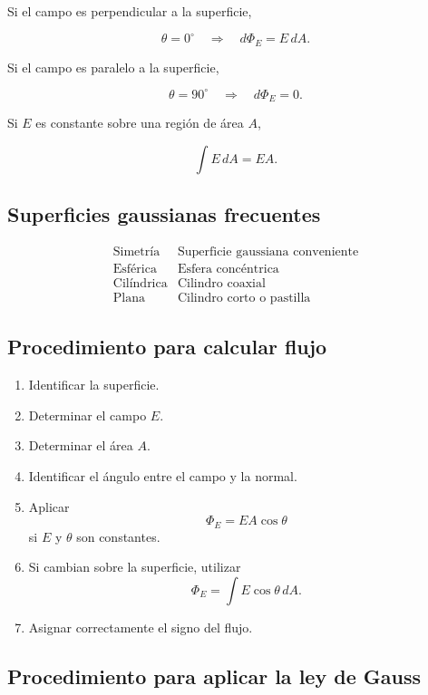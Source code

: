 Si el campo es perpendicular a la superficie,

\[
\theta=0^\circ
\quad\Longrightarrow\quad
\boxed{d\Phi_E=E\,dA}.
\]

Si el campo es paralelo a la superficie,

\[
\theta=90^\circ
\quad\Longrightarrow\quad
\boxed{d\Phi_E=0}.
\]

Si \(E\) es constante sobre una región de área \(A\),

\[
\boxed{
\int E\,dA=EA
}.
\]


\subsection{Superficies gaussianas frecuentes}

\[
\boxed{
\begin{array}{c|c}
\text{Simetría} & \text{Superficie gaussiana conveniente}\\
\hline
\text{Esférica} & \text{Esfera concéntrica}\\
\text{Cilíndrica} & \text{Cilindro coaxial}\\
\text{Plana} & \text{Cilindro corto o pastilla}
\end{array}
}
\]


\subsection{Procedimiento para calcular flujo}

\begin{enumerate}
    \item Identificar la superficie.
    \item Determinar el campo \(E\).
    \item Determinar el área \(A\).
    \item Identificar el ángulo entre el campo y la normal.
    \item Aplicar
    \[
    \Phi_E=EA\cos\theta
    \]
    si \(E\) y \(\theta\) son constantes.
    \item Si cambian sobre la superficie, utilizar
    \[
    \Phi_E=\int E\cos\theta\,dA.
    \]
    \item Asignar correctamente el signo del flujo.
\end{enumerate}


\subsection{Procedimiento para aplicar la ley de Gauss}


